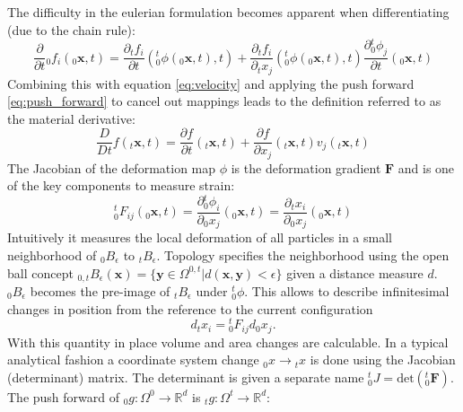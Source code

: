 \documentclass[m,times]{cgMA}
\begin{document}
The difficulty in the eulerian formulation becomes apparent when differentiating (due to the chain rule):
\begin{equation} \label{eq:eulerian_general}
  \frac {\partial}{\partial t} {_0f_i } ( {_0\boldsymbol { x }} ,  t  ) =
  \frac { \partial  {_tf_i} } { \partial t } ( {^t_0}\phi ( {_0\boldsymbol {x }} , t ) , t ) + \frac { \partial  {_tf_i }} { \partial {_tx_j} } ( {^t_0}\phi ( {_0\boldsymbol { x }} , t ) , t ) \frac { \partial {^t_0}\phi_j } { \partial t } ( {_0\boldsymbol { x }} , t )
\end{equation}
Combining this with equation \ref{eq:velocity} and applying the push forward \ref{eq:push_forward} to cancel out mappings leads to the definition referred to as the material derivative:
\begin{equation} \label{eq:material_derivative}
  \frac {  { D } } {   { D }   { t } }   {  {f} } ( _t\boldsymbol { x } ,   { t } ) = \frac { \partial   {  {f} } } { \partial   { t } } ( _t\boldsymbol {x } ,   { t } ) + \frac { \partial   {  {f} } } { \partial x _ {   { j } } } ( _t{\boldsymbol { x }} ,   { t } )  {v} _ {   { j } } ( _t\boldsymbol { x } ,   { t } )
\end{equation}
The Jacobian of the deformation map $\phi$ is the deformation gradient $\boldsymbol{F}$ and is one of the key components to measure strain:
\begin{equation}
  {^t_0 F_{ij}} ( _0\boldsymbol {x} ,  t  ) = \frac { \partial {^t_0\phi_i} } { \partial _0 x _j } ( _0\boldsymbol { x } , t ) = \frac { \partial _t x _i } { \partial _0 x_j } ( _0\boldsymbol { x } , t )
\end{equation}
Intuitively it measures the local deformation of all particles in a small neighborhood of $_0B_\epsilon$ to $_tB_\epsilon$. Topology specifies the neighborhood using the open ball concept $_{0,t}B_\epsilon(\boldsymbol{x}) = \{\boldsymbol{y} \in {\Omega^{0,t} | d(\boldsymbol{x},\boldsymbol{y}) < \epsilon}\}$ given a distance measure $d$. $_0B_\epsilon$ becomes the pre-image of $_tB_\epsilon$ under $_0^t\phi$. This allows to describe infinitesimal changes in position from the reference to the current configuration
\begin{equation}\label{eq:def_grad_pos}
  d {_tx_i} = {^t_0}F{_{ij}} d{_0x_j}.
\end{equation}
With this quantity in place volume and area changes are calculable. In a typical analytical fashion a coordinate system change $_0x \rightarrow {_tx}$ is done using the Jacobian (determinant) matrix. The determinant is given a separate name $^t_0J =\text{det}(^t_0\boldsymbol{F})$. The push forward of $_0g:\Omega^0\rightarrow \mathbb{R}^d$ is $_tg:\Omega^t\rightarrow \mathbb{R}^d$:
\end{document}
